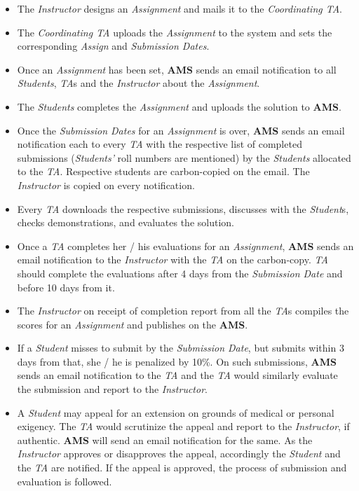\documentclass{article}
\begin{document}
\begin{enumerate}
\begin{enumerate}
\begin{itemize}
\item The {\em Instructor} designs an {\em Assignment} and mails it to the {\em Coordinating TA}.
\item The {\em Coordinating TA} uploads the {\em Assignment} to the system and sets the corresponding {\em Assign} and  {\em Submission Dates}. 
\item Once an {\em Assignment} has been set, {\bf AMS} sends an email notification to all {\em Students}, {\em TA}s and the {\em Instructor} about the {\em Assignment}.
\item The {\em Students} completes the {\em Assignment} and uploads the solution to {\bf AMS}. 
\item Once the {\em Submission Dates} for an {\em Assignment} is over, {\bf AMS} sends an email notification each to every {\em TA} with the respective list of completed submissions ({\em Students'} roll numbers are mentioned) by the {\em Students} allocated to the {\em TA}. Respective students are carbon-copied on the email. The {\em Instructor} is copied on every notification.
\item Every {\em TA} downloads the respective submissions, discusses with the {\em Student}s, checks demonstrations, and evaluates the solution.
\item Once a {\em TA} completes her / his evaluations for an {\em Assignment}, {\bf AMS} sends an email notification to the {\em Instructor} with the {\em TA} on the carbon-copy. {\em TA} should complete the evaluations after 4 days from the {\em Submission Date} and before 10 days from it. 
\item The {\em Instructor} on receipt of completion report from all the {\em TA}s compiles the scores for an {\em Assignment} and publishes on the {\bf AMS}.
\item If a {\em Student} misses to submit by the {\em Submission Date}, but submits within 3 days from that, she / he is penalized by 10\%. On such submissions, {\bf AMS} sends an email notification to the {\em TA} and the {\em TA} would similarly evaluate the submission and report to the {\em Instructor}.
\item A {\em Student} may appeal for an extension on grounds of medical or personal exigency. The {\em TA} would scrutinize the appeal and report to the {\em Instructor}, if authentic. {\bf AMS} will send an email notification for the same. As the {\em Instructor} approves or disapproves the appeal, accordingly the {\em Student} and the {\em TA} are notified. If the appeal is approved, the process of submission and evaluation is followed.
\end{itemize}


\end{enumerate}
\end{enumerate}
\end{document}
